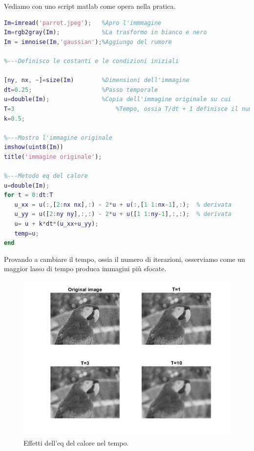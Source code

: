 \vspace{1em}

Vediamo con uno script matlab come opera nella pratica. \\

\begin{lstlisting}[language=MATLAB]
Im=imread('parrot.jpeg');   %Apro l'immmagine
Im=rgb2gray(Im);            %La trasformo in bianco e nero
Im = imnoise(Im,'gaussian');%Aggiungo del rumore

%---Definisco le costanti e le condizioni iniziali

[ny, nx, ~]=size(Im)        %Dimensioni dell'immagine
dt=0.25;                    %Passo temporale
u=double(Im);               %Copia dell'immagine originale su cui                                lavorare
T=3			                    %Tempo, ossia T/dt + 1 definisce il numero                            di iterazioni da eseguire
k=0.5;

%---Mostro l'immagine originale
imshow(uint8(Im))
title('immagine originale'); 

%---Metodo eq del calore
u=double(Im);
for t = 0:dt:T
   u_xx = u(:,[2:nx nx],:) - 2*u + u(:,[1 1:nx-1],:);  % derivata                                                           seconda lungo x
   u_yy = u([2:ny ny],:,:) - 2*u + u([1 1:ny-1],:,:);  % derivata                                                            seconda lungo y
   u= u + k*dt*(u_xx+u_yy);
   temp=u;
end

\end{lstlisting}
\vspace{1em}
Provando a cambiare il tempo, ossia il numero di iterazioni, osserviamo come un maggior lasso di tempo produca immagini più sfocate. \\

\begin{figure}[htb] 
\centering
\includegraphics[scale=0.4]{Pictures/Risultati/eq del calore.png}
\caption{Effetti dell'eq del calore nel tempo.}\label{fig:figura}
\end{figure}


